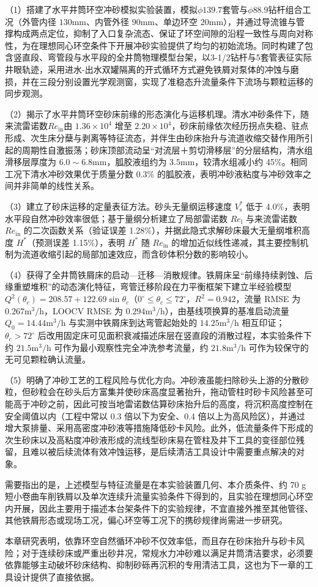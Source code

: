 （1）搭建了水平井筒环空冲砂模拟实验装置，模拟$\phi 139.7$套管与$\phi 88.9$钻杆组合工况（外管内径 $130\mathrm{mm}$、内管外径 $90\mathrm{mm}$、单边环空 $20\mathrm{mm}$），并通过导流锥与管撑构成两点定位，抑制了入口复杂流态、保证了环空间隙的沿程一致性与周向对称性，为在理想同心环空条件下开展冲砂实验提供了均匀的初始流场。同时构建了包含竖直段、弯管段与水平段的全井筒物理模型台架，以3-1/2\inch 钻杆与5\inch 套管表征实际井眼轨迹，采用进水-出水双罐隔离的开式循环方式避免铁屑对泵体的冲蚀与磨损，并在三段分别设置光学观测窗，实现了准稳态升流量条件下流场与颗粒运移的同步观测。

（2）揭示了水平井筒环空砂床前缘的形态演化与运移机理。清水冲砂条件下，随来流雷诺数$Re_{\mathrm{in}}$由 $1.36\times10^4$ 增至 $2.20\times10^4$，砂床前缘依次经历拐点失稳、驻点形成、次生床分蘖与剥离等特征流态，并伴生由砂床抬升与流道收缩交替作用所引起的周期性自激振荡；砂床顶部流动呈“对流层＋剪切滑移层”的分层结构，清水组滑移层厚度为 $6.0\sim6.8\mathrm{mm}$，胍胶液组约为 $3.5\mathrm{mm}$，较清水组减小约 45\%。相同工况下清水冲砂效果优于质量分数 0.3\% 的胍胶液，表明冲砂液粘度与冲砂效率之间并非简单的线性关系。

（3）建立了砂床运移的定量表征方法。砂头无量纲运移速度 $V_\mathrm{s}^*$ 低于 4.0\%，表明水平段自然冲砂效率很低；基于量纲分析建立了局部雷诺数 $Re_\mathrm{l}$ 与来流雷诺数 $Re_{\mathrm{in}}$ 的二次函数关系（验证误差 1.28\%），并据此隐式求解砂床最大无量纲堆积高度 $H^*$（预测误差 1.15\%），表明 $H^*$ 随 $Re_{\mathrm{in}}$ 的增加近似线性递减，其主要控制机制为流道收缩引起的局部加速效应，而含砂体积分数的影响较小。

（4）获得了全井筒铁屑床的启动—迁移—消散规律。铁屑床呈“前缘持续剥蚀、后缘重塑堆积”的动态演化特征，弯管迁移阶段在力平衡框架下建立半经验模型 $Q^2(\theta_c)=208.57+122.69\sin\theta_c$（$0^\circ\le\theta_c\le72^\circ$，$R^2=0.942$，流量 RMSE 为 $0.267\mathrm{m^3/h}$，LOOCV RMSE 为 $0.294\mathrm{m^3/h}$），由基线项换算的基准启动流量 $Q_0=14.44\mathrm{m^3/h}$ 与实测中铁屑床到达弯管起始处的 $14.25\mathrm{m^3/h}$ 相互印证；$\theta_c>72^\circ$ 后改用固定床可见面积衰减描述床层在竖直段的消散过程，本实验条件下约 $21.5\mathrm{m^3/h}$ 可作为最小观察性完全冲洗参考流量，约 $21.8\mathrm{m^3/h}$ 可作为较保守的无可见颗粒确认流量。

（5）明确了冲砂工艺的工程风险与优化方向。冲砂液虽能扫除砂头上游的分散砂粒，但砂粒会在砂头后方富集并使砂床高度显著抬升，拖动管柱时砂卡风险甚至可能高于冲砂之前，因此可按当地雷诺数估算砂床抬升后的高度，将沉积高度控制在安全阈值以内（工程中常以 0.3 倍以下为安全、0.4 倍以上为高风险区），并通过增大泵排量、采用高密度冲砂液等措施降低砂卡风险。此外，低流量条件下形成的次生砂床以及高粘度冲砂液形成的流线型砂床易在管柱及井下工具的变径部位残留，且难以被后续流体有效冲蚀运移，是后续清洁工具设计中需要重点解决的对象。

需要指出的是，上述模型与特征流量是在本实验装置几何、本介质条件、约 70 g 短小卷曲车削铁屑以及单次连续升流量实验条件下得到的，且实验在理想同心环空内开展，因此主要用于描述本台架条件下的实验规律，不宜直接外推至其他管径、其他铁屑形态或现场工况，偏心环空等工况下的携砂规律尚需进一步研究。

本章研究表明，依靠环空自然循环冲砂不仅效率低，而且存在砂床抬升与砂卡风险；对于连续砂床或严重出砂井况，常规水力冲砂难以满足井筒清洁要求，必须要依靠能够主动破坏砂床结构、抑制砂砾再沉积的专用清洁工具，这也为下一章的工具设计提供了直接依据。

